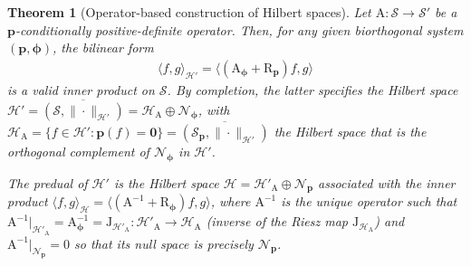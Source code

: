 \documentclass[10pt,a4paper]{amsart}
\newtheorem{theorem}{Theorem}
\def\Op#1{{\mathrm{#1}}}  %
\def\Spc#1{{\mathcal{#1}}}  %
\def\V#1{{\boldsymbol{#1}}}         %
\begin{document}
\begin{theorem}[Operator-based construction of Hilbert spaces]
\label{Theo:conditionPos}
Let $\Op A: \Spc S \to \Spc S'$ be a $\V p$-conditionally positive-definite operator.
Then, for any given biorthogonal system $(\V p, \V \phi)$, the bilinear form
\begin{align}
\label{Eq:BPinnerA}
\langle f,g\rangle_{\Spc H'}=\langle(\Op A_{\V \phi} + \Op R_{\V p}) f,g\rangle
\end{align}
is a valid inner product on $\Spc S$. By completion, the latter specifies the Hilbert space $\Spc H'=\overline{(\Spc S,\|\cdot\|_{\Spc H'})}=\Spc H_{\Op A} \oplus \Spc N_{\V \phi}$, with
$\Spc H_{\Op A}=\{f \in \Spc H': \V p(f)=\V 0\}=\overline{(\Spc S_{\V p},\|\cdot\|_{\Spc H'})}$ the Hilbert space that is the orthogonal complement of $ \Spc N_{\V \phi}$ in $\Spc H'$. 

The predual of $\Spc H'$
is the Hilbert space $\Spc H=\Spc H'_{\Op A} \oplus \Spc N_{\V p}$ associated with the inner product $\langle f,g\rangle_{\Spc H}=\langle(\Op A^{-1} + \Op R_{\V \phi}) f,g\rangle$,
where $\Op A^{-1}$ is the unique operator such that $\Op A^{-1}|_{\Spc H'_{\Op A}}=\Op A_{\V \phi}^{-1}=\Op J_{\Spc H'_{\Op A}}: \Spc H'_{\Op A} \to \Spc H_{\Op A}$ (inverse of the Riesz map $\Op J_{\Spc H_{\Op A}}$) and $\Op A^{-1}|_{\Spc N_{\V p}}=0$ so that its null space is precisely $\Spc N_{\V p}$.

\end{theorem}
\end{document}
